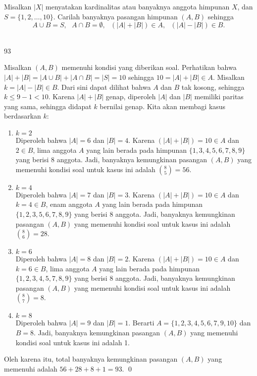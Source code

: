 \documentclass[11pt]{scrartcl}
\begin{document}
	\begin{soalbaru}
			Misalkan $|X|$ menyatakan kardinalitas atau banyaknya anggota himpunan $X$, dan $S=\{1,2,\dots,10\}$. Carilah banyaknya pasangan himpunan $(A,B)$ sehingga\\[-20pt]
			$$A \cup B = S,\text{ } A \cap B = \emptyset, \text{ } (|A|+|B|) \in A,\text{ } (|A|-|B|) \in B. $$\\[-30pt] %
			\begin{jawaban}
				93
			\end{jawaban}
			\begin{solusi}
			Misalkan $(A,B)$ memenuhi kondisi yang diberikan soal. Perhatikan bahwa $|A|+|B|=|A \cup B|+|A \cap B|=|S|=10$ sehingga $10=|A|+|B| \in A$. Misalkan $k=|A|-|B| \in B$. Dari sini dapat dilihat bahwa $A$ dan $B$ tak kosong, sehingga $k \le 9-1 <10$. Karena $|A|+|B|$ genap, diperoleh $|A|$ dan $|B|$ memiliki paritas yang sama, sehingga didapat $k$ bernilai genap. Kita akan membagi kasus berdasarkan $k$:
			\begin{enumerate}
			\item $k=2$ \\
			Diperoleh bahwa $|A|=6$ dan $|B|=4$. Karena $(|A|+|B|)=10 \in A$ dan $2 \in B$, lima anggota $A$ yang lain berada pada himpunan $\{1,3,4,5,6,7,8,9\}$ yang berisi 8 anggota. Jadi, banyaknya kemungkinan pasangan $(A,B)$ yang memenuhi kondisi soal untuk kasus ini adalah ${8 \choose 5 }=56$.
			
			\item $k=4$ \\
						Diperoleh bahwa $|A|=7$ dan $|B|=3$. Karena $(|A|+|B|)=10 \in A$ dan $k=4 \in B$, enam anggota $A$ yang lain berada pada himpunan $\{1,2,3,5,6,7,8,9\}$ yang berisi 8 anggota. Jadi, banyaknya kemungkinan pasangan $(A,B)$ yang memenuhi kondisi soal untuk kasus ini adalah ${8 \choose 6 }=28$.
						
			\item $k=6$ \\
						Diperoleh bahwa $|A|=8$ dan $|B|=2$. Karena $(|A|+|B|)=10 \in A$ dan $k=6 \in B$, lima anggota $A$ yang lain berada pada himpunan $\{1,2,3,4,5,7,8,9\}$ yang berisi 8 anggota. Jadi, banyaknya kemungkinan pasangan $(A,B)$ yang memenuhi kondisi soal untuk kasus ini adalah ${8 \choose 7 }=8$.
				
			\item $k=8$ \\
						Diperoleh bahwa $|A|=9$ dan $|B|=1$. Berarti $A=\{1,2,3,4,5,6,7,9,10\}$ dan $B={8}$. Jadi, banyaknya kemungkinan pasangan $(A,B)$ yang memenuhi kondisi soal untuk kasus ini adalah 1.
						
			\end{enumerate}
			
			Oleh karena itu, total banyaknya kemungkinan pasangan $(A,B)$ yang memenuhi adalah $56+28+8+1=93.$ \qed
			\end{solusi}
			\vspace{10pt}
		\end{soalbaru}
\end{document}

